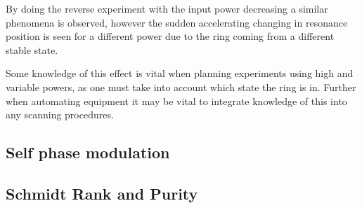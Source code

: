 By doing the reverse experiment with the input power decreasing a similar phenomena is observed, however the sudden accelerating changing in resonance position is seen for a different power due to the ring coming from a different stable state. 

Some knowledge of this effect is vital when planning experiments using high and variable powers, as one must take into account which state the ring is in. Further when automating equipment it may be vital to integrate knowledge of this into any scanning procedures. 


\subsection{Self phase modulation}
\subsection{Schmidt Rank and Purity}
